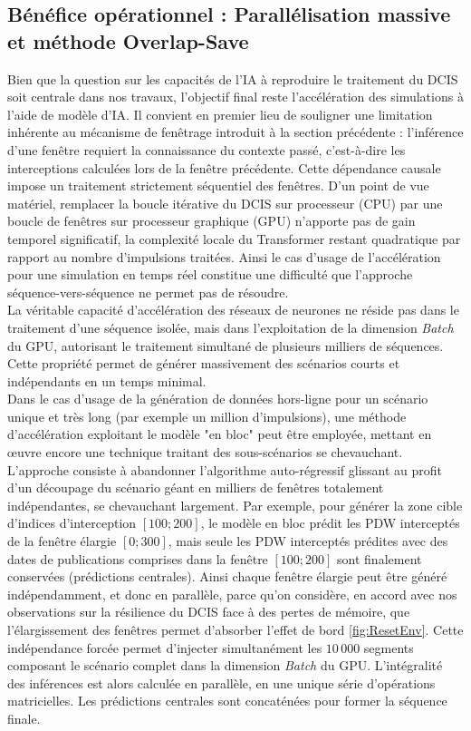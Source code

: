 \subsection{Bénéfice opérationnel : Parallélisation massive et méthode Overlap-Save}
\label{disc:seq2seq}
Bien que la question sur les capacités de l'IA à reproduire le traitement du DCIS soit centrale dans nos travaux, l'objectif final reste l'accélération des simulations à l'aide de modèle d'IA. Il convient en premier lieu de souligner une limitation inhérente au mécanisme de fenêtrage introduit à la section précédente : l'inférence d'une fenêtre requiert la connaissance du contexte passé, c'est-à-dire les interceptions calculées lors de la fenêtre précédente. Cette dépendance causale impose un traitement strictement séquentiel des fenêtres. D'un point de vue matériel, remplacer la boucle itérative du DCIS sur processeur (CPU) par une boucle de fenêtres sur processeur graphique (GPU) n'apporte pas de gain temporel significatif, la complexité locale du Transformer restant quadratique par rapport au nombre d'impulsions traitées. Ainsi le cas d'usage de l'accélération pour une simulation en temps réel constitue une difficulté que l'approche séquence-vers-séquence ne permet pas de résoudre.\\

La véritable capacité d'accélération des réseaux de neurones ne réside pas dans le traitement d'une séquence isolée, mais dans l'exploitation de la dimension \textit{Batch} du GPU, autorisant le traitement simultané de plusieurs milliers de séquences. Cette propriété permet de générer massivement des scénarios courts et indépendants en un temps minimal.\\

Dans le cas d'usage de la génération de données hors-ligne pour un scénario unique et très long (par exemple un million d'impulsions), une méthode d'accélération exploitant le modèle "en bloc" peut être employée, mettant en œuvre encore une technique traitant des sous-scénarios se chevauchant. L'approche consiste à abandonner l'algorithme auto-régressif glissant au profit d'un découpage du scénario géant en milliers de fenêtres totalement indépendantes, se chevauchant largement.
Par exemple, pour générer la zone cible d'indices d'interception $[100; 200]$, le modèle en bloc prédit les PDW interceptés de la fenêtre élargie $[0; 300]$, mais seule les PDW interceptés prédites avec des dates de publications comprises dans la fenêtre $[100; 200]$ sont finalement conservées (prédictions centrales). Ainsi chaque fenêtre élargie peut être généré indépendamment, et donc en parallèle, parce qu'on considère, en accord avec nos observations sur la résilience du DCIS face à des pertes de mémoire, que l'élargissement des fenêtres permet d'absorber l'effet de bord \ref{fig:ResetEnv}. Cette indépendance forcée permet d'injecter simultanément les $10\,000$ segments composant le scénario complet dans la dimension \textit{Batch} du GPU. L'intégralité des inférences est alors calculée en parallèle, en une unique série d'opérations matricielles. Les prédictions centrales sont concaténées pour former la séquence finale.\\

